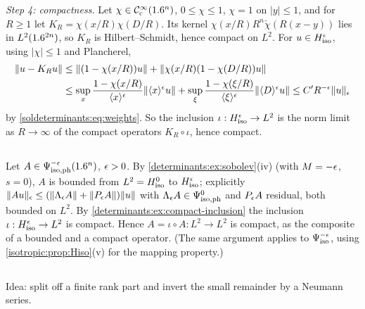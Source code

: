 \emph{Step 4: compactness.} Let $\chi\in\mathcal{C}^\infty_{\mathrm{c}}(1.6^n)$, $0\le\chi\le1$, $\chi=1$ on $|y|\le1$, and for
$R\ge1$ let $K_R=\chi(x/R)\chi(D/R)$. Its kernel $\chi(x/R)R^n\check\chi(R(x-y))$ lies in
$L^2(1.6^{2n})$, so $K_R$ is Hilbert--Schmidt, hence compact on $L^2$. For
$u\in H^{\epsilon}_{\mathrm{iso}}$, using $|\chi|\le1$ and Plancherel,
\begin{align*}
  \lVert u-K_Ru\rVert&\le\lVert (1-\chi(x/R))u\rVert+\lVert \chi(x/R)(1-\chi(D/R))u\rVert\\
  &\le\sup_x\frac{1-\chi(x/R)}{\langle x\rangle^\epsilon}\lVert \langle x\rangle^\epsilon u\rVert+\sup_\xi\frac{1-\chi(\xi/R)}{\langle \xi\rangle^\epsilon}\lVert \langle D\rangle^\epsilon u\rVert
  \le C'R^{-\epsilon}\lVert u\rVert_\epsilon
\end{align*}
by \eqref{soldeterminants:eq:weights}. So the inclusion $\iota:H^{\epsilon}_{\mathrm{iso}}\to L^2$ is the norm limit
as $R\to\infty$ of the compact operators $K_R\circ\iota$, hence compact.

\subsection*{}
Let $A\in\Psi^{-\epsilon}_{\mathrm{iso,ph}}(1.6^n)$, $\epsilon>0$. By \cref{determinants:ex:sobolev}(iv) (with $M=-\epsilon$,
$s=0$), $A$ is bounded from $L^2=H^{0}_{\mathrm{iso}}$ to $H^{\epsilon}_{\mathrm{iso}}$; explicitly
$\lVert Au\rVert_\epsilon\le(\lVert \Lambda_\epsilon A\rVert+\lVert P_\epsilon A\rVert)\lVert u\rVert$ with $\Lambda_\epsilon A\in\Psi^{0}_{\mathrm{iso,ph}}$ and
$P_\epsilon A$ residual, both bounded on $L^2$. By \cref{determinants:ex:compact-inclusion} the inclusion
$\iota:H^{\epsilon}_{\mathrm{iso}}\to L^2$ is compact. Hence $A=\iota\circ A:L^2\to L^2$ is compact, as
the composite of a bounded and a compact operator. (The same argument applies to $\Psi^{-\epsilon}_{\mathrm{iso}}$,
using \cref{isotropic:prop:Hiso}(v) for the mapping property.)

\subsection*{}
Idea: split off a finite rank part and invert the small remainder by a Neumann series.

